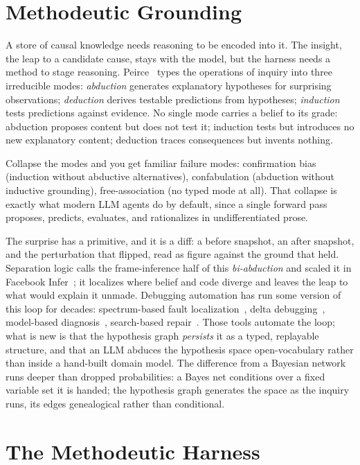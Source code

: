 \documentclass[sigconf,review,anonymous]{acmart}
\begin{document}
\section{Methodeutic Grounding}\label{sec:method-grounding}

A store of causal knowledge needs reasoning to be encoded into it. The insight, the leap to a candidate cause, stays with the model, but the harness needs a method to stage reasoning. Peirce~\cite{peirce1878,peirce1903} types the operations of inquiry into three irreducible modes: \emph{abduction} generates explanatory hypotheses for surprising observations; \emph{deduction} derives testable predictions from hypotheses; \emph{induction} tests predictions against evidence. No single mode carries a belief to its grade: abduction proposes content but does not test it; induction tests but introduces no new explanatory content; deduction traces consequences but invents nothing.

Collapse the modes and you get familiar failure modes: confirmation bias (induction without abductive alternatives), confabulation (abduction without inductive grounding), free-association (no typed mode at all). That collapse is exactly what modern LLM agents do by default, since a single forward pass proposes, predicts, evaluates, and rationalizes in undifferentiated prose.

The surprise has a primitive, and it is a diff: a before snapshot, an after snapshot, and the perturbation that flipped, read as figure against the ground that held. Separation logic calls the frame-inference half of this \emph{bi-abduction} and scaled it in Facebook Infer~\cite{biabduction}; it localizes where belief and code diverge and leaves the leap to what would explain it unmade. Debugging automation has run some version of this loop for decades: spectrum-based fault localization~\cite{jones2002}, delta debugging~\cite{zeller2002}, model-based diagnosis~\cite{reiter1987}, search-based repair~\cite{legoues2012,monperrus2018}. Those tools automate the loop; what is new is that the hypothesis graph \emph{persists} it as a typed, replayable structure, and that an LLM abduces the hypothesis space open-vocabulary rather than inside a hand-built domain model. The difference from a Bayesian network~\cite{pearl1988} runs deeper than dropped probabilities: a Bayes net conditions over a fixed variable set it is handed; the hypothesis graph generates the space as the inquiry runs, its edges genealogical rather than conditional.

\section{The Methodeutic Harness}\label{sec:harness}
\end{document}
